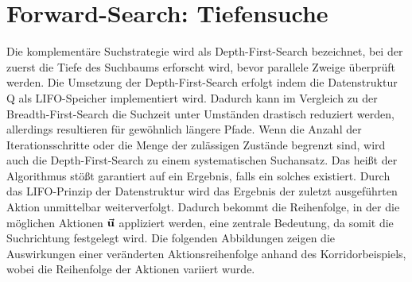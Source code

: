 \section{Forward-Search: Tiefensuche}
Die komplementäre Suchstrategie wird als Depth-First-Search bezeichnet, bei der zuerst die Tiefe des Suchbaums erforscht wird, bevor parallele Zweige überprüft werden. Die Umsetzung der Depth-First-Search erfolgt indem die Datenstruktur Q als LIFO-Speicher implementiert wird. Dadurch kann im Vergleich zu der Breadth-First-Search die Suchzeit unter Umständen drastisch reduziert werden, allerdings resultieren für gewöhnlich längere Pfade. Wenn die Anzahl der Iterationsschritte oder die Menge der zulässigen Zustände begrenzt sind, wird auch die Depth-First-Search zu einem systematischen Suchansatz. Das heißt der Algorithmus stößt garantiert auf ein Ergebnis, falls ein solches existiert. Durch das LIFO-Prinzip der Datenstruktur wird das Ergebnis der zuletzt ausgeführten Aktion unmittelbar weiterverfolgt. Dadurch bekommt die Reihenfolge, in der die möglichen Aktionen $\vec{\mathbf{u}}$ appliziert werden, eine zentrale Bedeutung, da somit die Suchrichtung festgelegt wird. Die folgenden Abbildungen zeigen die Auswirkungen einer veränderten Aktionsreihenfolge anhand des Korridorbeispiels, wobei die Reihenfolge der Aktionen variiert wurde.
